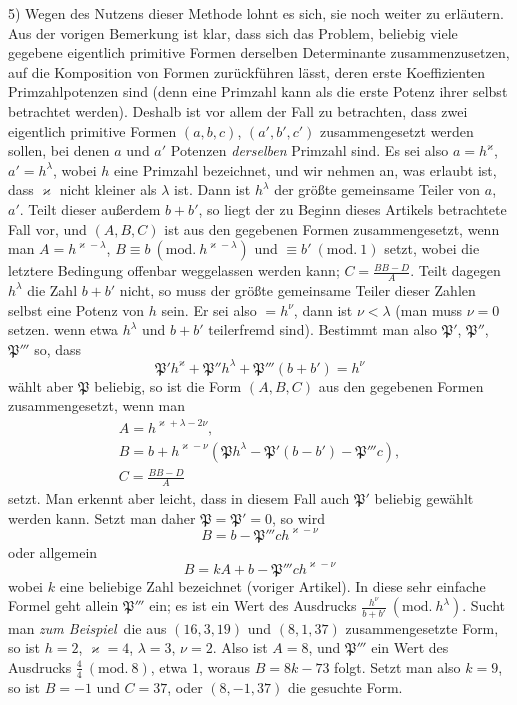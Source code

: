 5) Wegen des Nutzens dieser Methode lohnt es sich, sie noch weiter zu erläutern. Aus der vorigen Bemerkung ist klar, dass sich das Problem, beliebig viele gegebene eigentlich primitive Formen derselben Determinante zusammenzusetzen, auf die Komposition von Formen zurückführen lässt, deren erste Koeffizienten Primzahlpotenzen sind (denn eine Primzahl kann als die erste Potenz ihrer selbst betrachtet werden). Deshalb ist vor allem der Fall zu betrachten, dass zwei eigentlich primitive Formen $(a,b,c)$, $(a',b',c')$ zusammengesetzt werden sollen, bei denen $a$ und $a'$ Potenzen \textit{derselben} Primzahl sind. Es sei also $a=h^{\varkappa}$, $a'=h^{\lambda}$, wobei $h$ eine Primzahl bezeichnet, und wir nehmen an, was erlaubt ist, dass $\varkappa$ nicht kleiner als $\lambda$ ist. Dann ist $h^{\lambda}$ der größte gemeinsame Teiler von $a$, $a'$. Teilt dieser außerdem $b+b'$, so liegt der zu Beginn dieses Artikels betrachtete Fall vor, und $(A,B,C)$ ist aus den gegebenen Formen zusammengesetzt, wenn man $A=h^{\varkappa-\lambda}$, $B\equiv b\ (\mathrm{mod.}\ h^{\varkappa-\lambda})$ und $\equiv b'\ (\mathrm{mod.}\ 1)$ setzt, wobei die letztere Bedingung offenbar weggelassen werden kann; $C=\frac{BB-D}{A}$. Teilt dagegen $h^{\lambda}$ die Zahl $b+b'$ nicht, so muss der größte gemeinsame Teiler dieser Zahlen selbst eine Potenz von $h$ sein. Er sei also $=h^{\nu}$, dann ist $\nu<\lambda$ (man muss $\nu=0$ setzen. wenn etwa $h^{\lambda}$ und $b+b'$ teilerfremd sind). Bestimmt man also $\mathfrak{P}'$, $\mathfrak{P}''$, $\mathfrak{P}'''$ so, dass
\[
\mathfrak{P}'h^{\varkappa}+\mathfrak{P}''h^{\lambda}+\mathfrak{P}'''(b+b')=h^{\nu}
\]
wählt aber $\mathfrak{P}$ beliebig, so ist die Form $(A,B,C)$ aus den gegebenen Formen zusammengesetzt, wenn man
\[
\begin{gathered}A=h^{\varkappa+\lambda-2\nu},\\
B=b+h^{\varkappa-\nu}(\mathfrak{P}h^{\lambda}-\mathfrak{P}'(b-b')-\mathfrak{P}'''c),\\
C=\frac{BB-D}{A}\end{gathered}
\]
setzt. Man erkennt aber leicht, dass in diesem Fall auch $\mathfrak{P}'$ beliebig gewählt werden kann. Setzt man daher $\mathfrak{P}=\mathfrak{P}'=0$, so wird
\[
B=b-\mathfrak{P}'''ch^{\varkappa-\nu}
\]
oder allgemein
\[
B=kA+b-\mathfrak{P}'''ch^{\varkappa-\nu}
\]
wobei $k$ eine beliebige Zahl bezeichnet (voriger Artikel). In diese sehr einfache Formel geht allein $\mathfrak{P}'''$ ein; es ist ein Wert des Ausdrucks $\frac{h^{\nu}}{b+b'}\ (\mathrm{mod.}\ h^{\lambda})$. Sucht man \textit{zum Beispiel}\ die aus $(16,3,19)$ und $(8,1,37)$ zusammengesetzte Form, so ist $h=2$, $\varkappa=4$, $\lambda=3$, $\nu=2$.
Also ist $A=8$, und $\mathfrak{P}'''$ ein Wert des Ausdrucks $\frac{4}{4}\ (\mathrm{mod.}\ 8)$, etwa $1$, woraus $B=8k-73$ folgt. Setzt man also $k=9$, so ist $B=-1$ und $C=37$, oder $(8,-1,37)$ die gesuchte Form.

